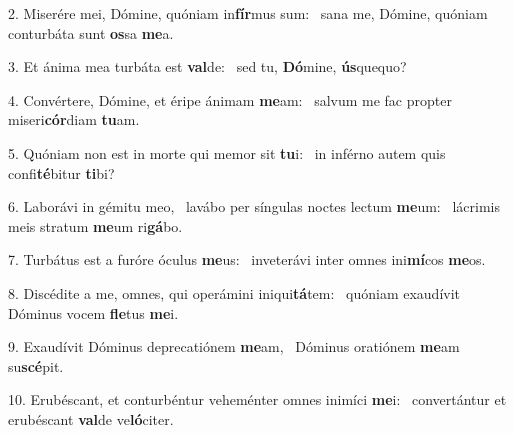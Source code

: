 2. Miserére mei, Dómine, quóniam in\textbf{fír}mus sum: \ast\  sana me, Dómine, quóniam conturbáta sunt \textbf{os}sa \textbf{me}a.\

3. Et ánima mea turbáta est \textbf{val}de: \ast\  sed tu, \textbf{Dó}mine, \textbf{ús}quequo?\

4. Convértere, Dómine, et éripe ánimam \textbf{me}am: \ast\  salvum me fac propter miseri\textbf{cór}diam \textbf{tu}am.\

5. Quóniam non est in morte qui memor sit \textbf{tu}i: \ast\  in inférno autem quis confi\textbf{té}bitur \textbf{ti}bi?\

6. Laborávi in gémitu meo, \dag\  lavábo per síngulas noctes lectum \textbf{me}um: \ast\  lácrimis meis stratum \textbf{me}um ri\textbf{gá}bo.\

7. Turbátus est a furóre óculus \textbf{me}us: \ast\  inveterávi inter omnes ini\textbf{mí}cos \textbf{me}os.\

8. Discédite a me, omnes, qui operámini iniqui\textbf{tá}tem: \ast\  quóniam exaudívit Dóminus vocem \textbf{fle}tus \textbf{me}i.\

9. Exaudívit Dóminus deprecatiónem \textbf{me}am, \ast\  Dóminus oratiónem \textbf{me}am su\textbf{scé}pit.\

10. Erubéscant, et conturbéntur veheménter omnes inimíci \textbf{me}i: \ast\  convertántur et erubéscant \textbf{val}de ve\textbf{ló}citer.\

